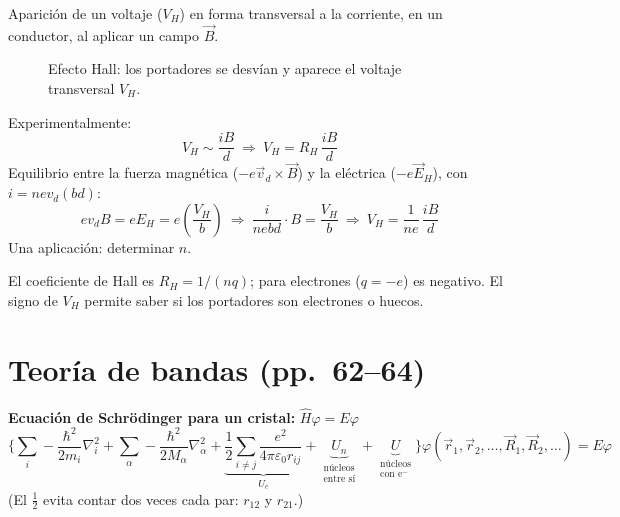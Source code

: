 \documentclass[11pt,a4paper]{article}
\newcommand{\pags}[1]{{\normalfont\small\color{gris}(pp.~#1)}}
\begin{document}
Aparición de un voltaje ($V_H$) en forma transversal a la corriente, en un conductor, al aplicar un campo $\vec B$.

\begin{figure}[H]
\centering
{}
\caption{Efecto Hall: los portadores se desvían y aparece el voltaje transversal $V_H$.}
\end{figure}

Experimentalmente:
\[
V_H\sim\frac{iB}{d}\ \Rightarrow\ V_H=R_H\,\frac{iB}{d}
\]
Equilibrio entre la fuerza magnética ($-e\vec v_d\times\vec B$) y la eléctrica ($-e\vec E_H$), con $i=nev_d(bd)$:
\[
ev_dB=eE_H=e\left(\frac{V_H}{b}\right)\ \Rightarrow\ \frac{i}{nebd}\cdot B=\frac{V_H}{b}\ \Rightarrow\ \boxed{V_H=\frac{1}{ne}\,\frac{iB}{d}}
\]
Una aplicación: determinar $n$.

\begin{obs}
El coeficiente de Hall es $R_H=1/(nq)$; para electrones ($q=-e$) es negativo. El signo de $V_H$ permite saber si los portadores
son electrones o huecos.
\end{obs}

\section{Teoría de bandas \pags{62--64}}

\textbf{Ecuación de Schrödinger para un cristal:} $\hat H\varphi=E\varphi$
\[
\Bigg\{\sum_i-\frac{\hbar^2}{2m_i}\nabla_i^2+\sum_\alpha-\frac{\hbar^2}{2M_\alpha}\nabla_\alpha^2
+\underbrace{\frac12\sum_{i\neq j}\frac{e^2}{4\pi\varepsilon_0r_{ij}}}_{U_e}
+\underbrace{U_n}_{\substack{\text{núcleos}\\ \text{entre sí}}}+\underbrace{U}_{\substack{\text{núcleos}\\ \text{con e}^-}}\Bigg\}
\varphi(\vec r_1,\vec r_2,\ldots,\vec R_1,\vec R_2,\ldots)=E\varphi
\]
(El $\tfrac12$ evita contar dos veces cada par: $r_{12}$ y $r_{21}$.)
\end{document}

